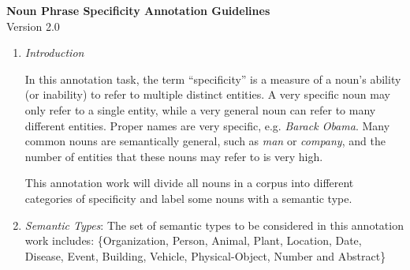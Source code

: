 \documentclass[letterpaper,12pt]{article}
\begin{document}
\begin{center}
\textbf{Noun Phrase Specificity Annotation Guidelines}\\
Version 2.0
\end{center}

\begin{enumerate}
  \item \emph{Introduction}

In this annotation task, the term ``specificity'' is a measure of a noun's ability (or inability) to refer to multiple distinct entities.
A very specific noun may only refer to a single entity, while a very general noun can refer to many different entities.
Proper names are very specific, e.g. \emph{Barack Obama}. 
Many common nouns are semantically general, such as \emph{man} or \emph{company}, and the number of entities that these nouns may refer to is very high.

This annotation work will divide all nouns in a corpus into different categories of specificity and label some nouns with a semantic type.
	 
	 \item \emph{Semantic Types}: The set of semantic types to be considered in this annotation work includes: \{Organization, Person, Animal, Plant, Location, Date, Disease, Event, Building, Vehicle, Physical-Object, Number and Abstract\}


\end{enumerate}
\end{document}
